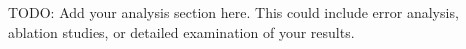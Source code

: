 

TODO: Add your analysis section here. This could include error analysis, ablation studies, or detailed examination of your results.